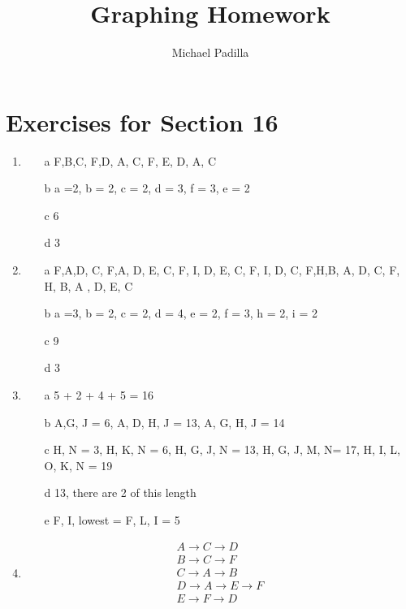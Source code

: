 \documentclass[12pt]{article}
\title{Graphing Homework}
\author{Michael Padilla}
\begin{document}
 
\maketitle
\section*{Exercises for Section 16}
\begin{enumerate}
	\item 
	    \begin{itemize}
		\item [a ] {F,B,C}, {F,D, A, C}, {F, E, D, A, C}
		\item [b] a =2, b = 2, c = 2, d = 3, f = 3, e = 2
		\item [c ]6
		\item [d ]3
	    \end{itemize}
	\item 
	    \begin{itemize}
		\item [a ] {F,A,D, C}, {F,A, D, E, C}, {F, I, D, E, C}, {F, I, D, C}, {F,H,B, A, D, C}, {F, H, B, A , D, E, C}
		\item [b] a =3, b = 2, c = 2, d = 4, e = 2, f = 3, h = 2, i = 2
		\item [c ]9
		\item [d ]3
	    \end{itemize}
	\item 
	    \begin{itemize}
		\item [a] 5 + 2 + 4 + 5 = 16
		\item [b] {A,G, J} = 6, {A, D, H, J} = 13, {A, G, H, J} = 14
		\item [c] {H, N} = 3, {H, K, N} = 6, {H, G, J, N} = 13, {H, G, J, M, N}= 17, {H, I, L, O, K, N} = 19
		\item [d] 13, there are 2 of this length
		\item [e] {F, I}, lowest = {F, L, I} = 5
	    \end{itemize}
	\item 
	    \begin{equation*}
	    	\begin{split}
	    		A \rightarrow C \rightarrow D\\
	    		B \rightarrow C \rightarrow F\\
	    		C \rightarrow A \rightarrow B\\
	    		D \rightarrow A \rightarrow E \rightarrow F\\
	    		E \rightarrow F \rightarrow D\\

\end{split}
\end{equation*}
\end{enumerate}
\end{document}
